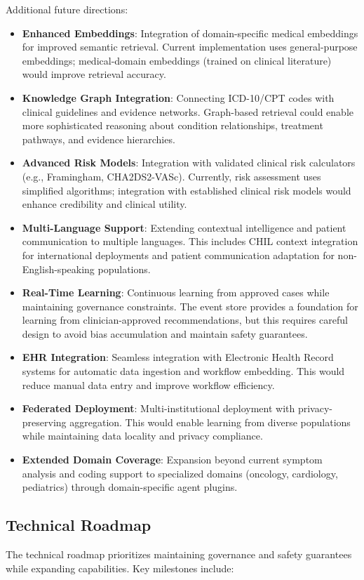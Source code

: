 \documentclass[journal]{IEEEtran}
\begin{document}
Additional future directions:
\begin{itemize}
    \item \textbf{Enhanced Embeddings}: Integration of domain-specific medical embeddings for improved semantic retrieval. Current implementation uses general-purpose embeddings; medical-domain embeddings (trained on clinical literature) would improve retrieval accuracy.
    \item \textbf{Knowledge Graph Integration}: Connecting ICD-10/CPT codes with clinical guidelines and evidence networks. Graph-based retrieval could enable more sophisticated reasoning about condition relationships, treatment pathways, and evidence hierarchies.
    \item \textbf{Advanced Risk Models}: Integration with validated clinical risk calculators (e.g., Framingham, CHA2DS2-VASc). Currently, risk assessment uses simplified algorithms; integration with established clinical risk models would enhance credibility and clinical utility.
    \item \textbf{Multi-Language Support}: Extending contextual intelligence and patient communication to multiple languages. This includes CHIL context integration for international deployments and patient communication adaptation for non-English-speaking populations.
    \item \textbf{Real-Time Learning}: Continuous learning from approved cases while maintaining governance constraints. The event store provides a foundation for learning from clinician-approved recommendations, but this requires careful design to avoid bias accumulation and maintain safety guarantees.
    \item \textbf{EHR Integration}: Seamless integration with Electronic Health Record systems for automatic data ingestion and workflow embedding. This would reduce manual data entry and improve workflow efficiency.
    \item \textbf{Federated Deployment}: Multi-institutional deployment with privacy-preserving aggregation. This would enable learning from diverse populations while maintaining data locality and privacy compliance.
    \item \textbf{Extended Domain Coverage}: Expansion beyond current symptom analysis and coding support to specialized domains (oncology, cardiology, pediatrics) through domain-specific agent plugins.
\end{itemize}

\subsection{Technical Roadmap}
The technical roadmap prioritizes maintaining governance and safety guarantees while expanding capabilities. Key milestones include:
\end{document}

